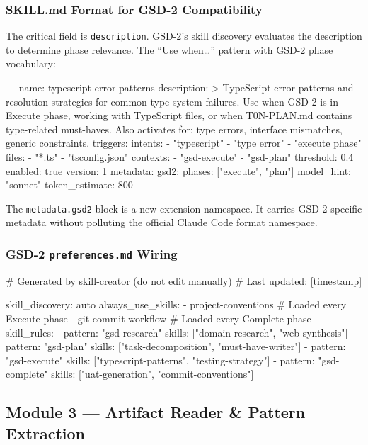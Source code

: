 \documentclass[11pt,letterpaper]{article}
\begin{document}
\subsubsection{SKILL.md Format for GSD-2 Compatibility}

The critical field is \texttt{description}. GSD-2's skill discovery evaluates the description to determine phase relevance. The ``Use when\ldots'' pattern with GSD-2 phase vocabulary:

\begin{asciibox}
---
name: typescript-error-patterns
description: >
  TypeScript error patterns and resolution strategies for common type
  system failures. Use when GSD-2 is in Execute phase, working with
  TypeScript files, or when T0N-PLAN.md contains type-related must-haves.
  Also activates for: type errors, interface mismatches, generic constraints.
triggers:
  intents:
    - "typescript"
    - "type error"
    - "execute phase"
  files:
    - "*.ts"
    - "tsconfig.json"
  contexts:
    - "gsd-execute"
    - "gsd-plan"
  threshold: 0.4
enabled: true
version: 1
metadata:
  gsd2:
    phases: ["execute", "plan"]
    model_hint: "sonnet"
    token_estimate: 800
---
\end{asciibox}

The \texttt{metadata.gsd2} block is a new extension namespace. It carries GSD-2-specific metadata without polluting the official Claude Code format namespace.

\subsubsection{GSD-2 \texttt{preferences.md} Wiring}

\begin{asciibox}
# Generated by skill-creator (do not edit manually)
# Last updated: [timestamp]

skill_discovery: auto
always_use_skills:
  - project-conventions      # Loaded every Execute phase
  - git-commit-workflow      # Loaded every Complete phase
skill_rules:
  - pattern: "gsd-research"
    skills: ["domain-research", "web-synthesis"]
  - pattern: "gsd-plan"
    skills: ["task-decomposition", "must-have-writer"]
  - pattern: "gsd-execute"
    skills: ["typescript-patterns", "testing-strategy"]
  - pattern: "gsd-complete"
    skills: ["uat-generation", "commit-conventions"]
\end{asciibox}

\subsection{Module 3 --- Artifact Reader \& Pattern Extraction}
\end{document}
